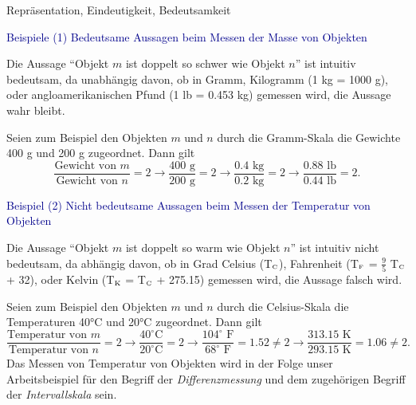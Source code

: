 \documentclass[
  8pt,
  ignorenonframetext,
]{beamer}
\begin{document}
\begin{frame}{Repräsentation, Eindeutigkeit, Bedeutsamkeit}
\protect\hypertarget{repruxe4sentation-eindeutigkeit-bedeutsamkeit-4}{}
\small

\textcolor{darkblue}{Beispiele (1) Bedeutsame Aussagen beim Messen der Masse von Objekten}

\footnotesize

Die Aussage ``Objekt \(m\) ist doppelt so schwer wie Objekt \(n\)'' ist
intuitiv bedeutsam, da unabhängig davon, ob in Gramm, Kilogramm (1 kg =
1000 g), oder angloamerikanischen Pfund (1 lb = 0.453 kg) gemessen wird,
die Aussage wahr bleibt.

Seien zum Beispiel den Objekten \(m\) und \(n\) durch die Gramm-Skala
die Gewichte 400 g und 200 g zugeordnet. Dann gilt \begin{equation}
\frac{\mbox{Gewicht von } m}{\mbox{Gewicht von } n} = 2
\rightarrow
\frac{400 \mbox{ g}}{200 \mbox{ g}} = 2
\rightarrow
\frac{0.4 \mbox{ kg}}{0.2 \mbox{ kg}} = 2
\rightarrow
\frac{0.88 \mbox{ lb}}{0.44 \mbox{ lb}} = 2.
\end{equation} \vspace{2mm}

\small

\textcolor{darkblue}{Beispiel (2) Nicht bedeutsame Aussagen beim Messen der Temperatur von Objekten}
\footnotesize

Die Aussage ``Objekt \(m\) ist doppelt so warm wie Objekt \(n\)'' ist
intuitiv nicht bedeutsam, da abhängig davon, ob in Grad Celsius
(T\(_{\mbox{\tiny C}}\)), Fahrenheit (T\(_{\mbox{\tiny F}}\) =
\(\frac{9}{5}\) T\(_{\mbox{\tiny C}}\) + 32), oder Kelvin
(T\(_{\mbox{\tiny K}}\) = T\(_{\mbox{\tiny C}}\) + 275.15) gemessen
wird, die Aussage falsch wird.

Seien zum Beispiel den Objekten \(m\) und \(n\) durch die Celsius-Skala
die Temperaturen 40°C und 20°C zugeordnet. Dann gilt \begin{equation}
\frac{\mbox{Temperatur von } m}{\mbox{Temperatur von } n} = 2
\rightarrow
\frac{40^{\circ} \mbox{C}}{20^{\circ} \mbox{C}} = 2
\rightarrow
\frac{104^{\circ} \mbox{ F}}{68^{\circ} \mbox{ F}} = 1.52 \neq 2
\rightarrow
\frac{313.15\mbox{ K}}{293.15\mbox{ K}} = 1.06 \neq 2.
\end{equation} Das Messen von Temperatur von Objekten wird in der Folge
unser Arbeitsbeispiel für den Begriff der \emph{Differenzmessung} und
dem zugehörigen Begriff der \emph{Intervallskala} sein.
\end{frame}
\end{document}
